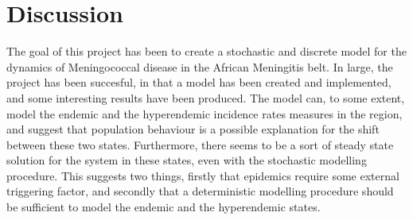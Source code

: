\documentclass[10pt,a4paper]{article}
\begin{document}







\section{Discussion}

The goal of this project has been to create a stochastic and discrete model for the dynamics of Meningococcal disease in the African Meningitis belt. In large, the project has been succesful, in that a model has been created and implemented, and some interesting results have been produced. The model can, to some extent, model the endemic and the hyperendemic incidence rates measures in the region, and suggest that population behaviour is a possible explanation for the shift between these two states. Furthermore, there seems to be a sort of steady state solution for the system in these states, even with the stochastic modelling procedure. This suggests two things, firstly that epidemics require some external triggering factor, and secondly that a deterministic modelling procedure should be sufficient to model the endemic and the hyperendemic states.
\end{document}
